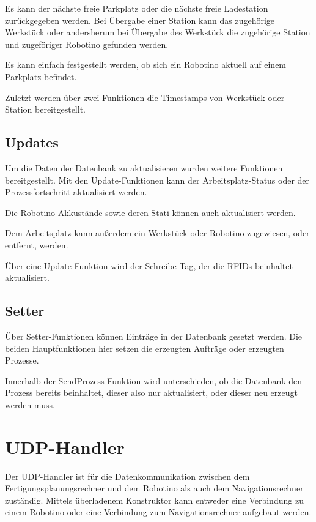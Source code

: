 Es kann der nächste freie Parkplatz oder die nächste freie Ladestation zurückgegeben werden. Bei Übergabe einer Station kann das zugehörige Werkstück oder andersherum bei Übergabe des Werkstück die zugehörige Station  und zugeföriger Robotino gefunden werden. 

Es kann einfach festgestellt werden, ob sich ein Robotino aktuell auf einem Parkplatz befindet.

Zuletzt werden über zwei Funktionen die Timestamps von Werkstück oder Station bereitgestellt.

\inlinetodo{}
\subsection{Updates}

Um die Daten der Datenbank zu aktualisieren wurden weitere Funktionen bereitgestellt. Mit den Update-Funktionen kann der Arbeitsplatz-Status oder der Prozessfortschritt aktualisiert werden. 

Die Robotino-Akkustände sowie deren Stati können auch aktualisiert werden.

Dem Arbeitsplatz kann außerdem ein Werkstück oder Robotino zugewiesen, oder entfernt, werden. 

Über eine Update-Funktion wird der Schreibe-Tag, der die RFIDs beinhaltet aktualisiert. 
\inlinetodo{}
\subsection{Setter}

Über Setter-Funktionen können Einträge in der Datenbank gesetzt werden. Die beiden Hauptfunktionen hier setzen die erzeugten Aufträge oder erzeugten Prozesse.

Innerhalb der SendProzess-Funktion wird unterschieden, ob die Datenbank den Prozess bereits beinhaltet, dieser also nur aktualisiert, oder dieser neu erzeugt werden muss. 

\inlinetodo{}

\section{UDP-Handler} 
\label{sec:UdpHandler}

Der UDP-Handler ist für die Datenkommunikation zwischen dem Fertigungsplanungsrechner und dem Robotino als auch dem Navigationsrechner zuständig. Mittels überladenem Konstruktor kann entweder eine Verbindung zu einem Robotino oder eine Verbindung zum Navigationsrechner aufgebaut werden. 

